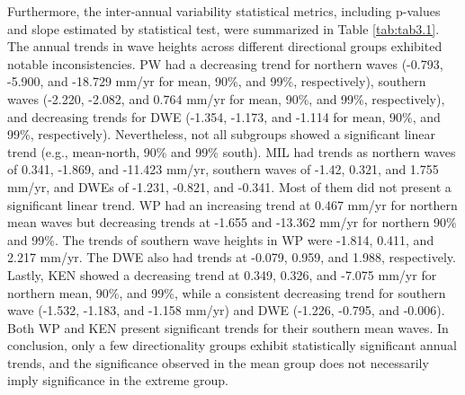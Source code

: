 Furthermore, the inter-annual variability statistical metrics, including p-values and slope estimated by statistical test, were summarized in Table \ref{tab:tab3.1}. The annual trends in wave heights across different directional groups exhibited notable inconsistencies. PW had a decreasing trend for northern waves (-0.793, -5.900, and -18.729 mm/yr for mean, 90\%, and 99\%, respectively), southern waves (-2.220, -2.082, and 0.764 mm/yr for mean, 90\%, and 99\%, respectively), and decreasing trends for DWE (-1.354, -1.173, and -1.114 for mean, 90\%, and 99\%, respectively). Nevertheless, not all subgroups showed a significant linear trend (e.g., mean-north, 90\% and 99\% south). MIL had trends as northern waves of 0.341, -1.869, and -11.423 mm/yr, southern waves of -1.42, 0.321, and 1.755 mm/yr, and DWEs of -1.231, -0.821, and -0.341. Most of them did not present a significant linear trend. WP had an increasing trend at 0.467 mm/yr for northern mean waves but decreasing trends at -1.655 and -13.362 mm/yr for northern 90\% and 99\%. The trends of southern wave heights in WP were -1.814, 0.411, and 2.217 mm/yr. The DWE also had trends at -0.079, 0.959, and 1.988, respectively. Lastly, KEN showed a decreasing trend at 0.349, 0.326, and -7.075 mm/yr for northern mean, 90\%, and 99\%, while a consistent decreasing trend for southern wave (-1.532, -1.183, and -1.158 mm/yr) and DWE (-1.226, -0.795, and -0.006). Both WP and KEN present significant trends for their southern mean waves. In conclusion, only a few directionality groups exhibit statistically significant annual trends, and the significance observed in the mean group does not necessarily imply significance in the extreme group.



